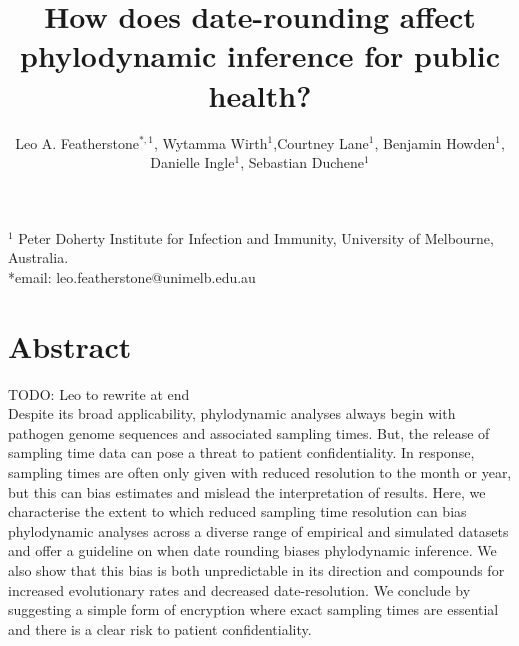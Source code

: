 \documentclass{article}
\title{How does date-rounding affect phylodynamic inference for public health?}
\author{Leo A. Featherstone$^{\ast,1}$, Wytamma Wirth$^{1}$,Courtney Lane$^{1}$, Benjamin Howden$^{1}$,\\Danielle Ingle$^{1}$, Sebastian Duchene$^{1}$}
\begin{document}
\maketitle
\linenumbers
$^{1}$ Peter Doherty Institute for Infection and Immunity, University of Melbourne, Australia.\\
*email: leo.featherstone@unimelb.edu.au

\section*{Abstract}
 TODO: Leo to rewrite at end \\
 Despite its broad applicability, phylodynamic analyses always begin with pathogen genome sequences and associated sampling times. But, the release of sampling time data can pose a threat to patient confidentiality. In response, sampling times are often only given with reduced resolution to the month or year, but this can bias estimates and mislead the interpretation of results. Here, we characterise the extent to which reduced sampling time resolution can bias phylodynamic analyses across a diverse range of empirical and simulated datasets and offer a guideline on when date rounding biases phylodynamic inference. We also show that this bias is both unpredictable in its direction and compounds for increased evolutionary rates and decreased date-resolution. We conclude by suggesting a simple form of encryption where exact sampling times are essential and there is a clear risk to patient confidentiality.
\end{document}
